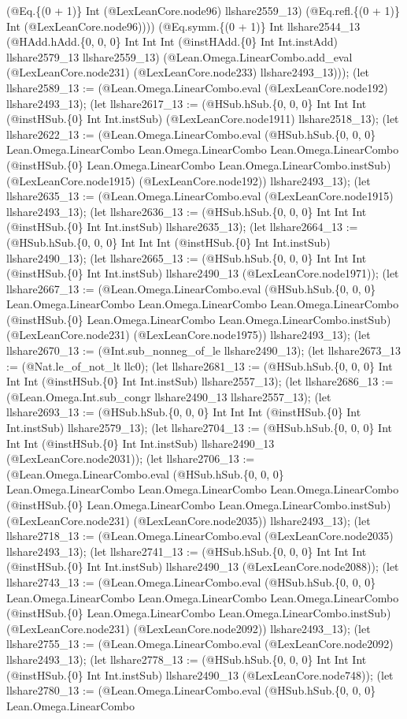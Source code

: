 \documentclass[11pt]{article}
\begin{document}
(@Eq.\{(0 + 1)\} Int (@LexLeanCore.node96) llshare2559\_13) (@Eq.refl.\{(0 + 1)\} Int (@LexLeanCore.node96)))) (@Eq.symm.\{(0 + 1)\} Int llshare2544\_13 (@HAdd.hAdd.\{0, 0, 0\} Int Int Int (@instHAdd.\{0\} Int Int.instAdd) llshare2579\_13 llshare2559\_13) (@Lean.Omega.LinearCombo.add\_eval (@LexLeanCore.node231) (@LexLeanCore.node233) llshare2493\_13))); (let llshare2589\_13 := (@Lean.Omega.LinearCombo.eval (@LexLeanCore.node192) llshare2493\_13); (let llshare2617\_13 := (@HSub.hSub.\{0, 0, 0\} Int Int Int (@instHSub.\{0\} Int Int.instSub) (@LexLeanCore.node1911) llshare2518\_13); (let llshare2622\_13 := (@Lean.Omega.LinearCombo.eval (@HSub.hSub.\{0, 0, 0\} Lean.Omega.LinearCombo Lean.Omega.LinearCombo Lean.Omega.LinearCombo (@instHSub.\{0\} Lean.Omega.LinearCombo Lean.Omega.LinearCombo.instSub) (@LexLeanCore.node1915) (@LexLeanCore.node192)) llshare2493\_13); (let llshare2635\_13 := (@Lean.Omega.LinearCombo.eval (@LexLeanCore.node1915) llshare2493\_13); (let llshare2636\_13 := (@HSub.hSub.\{0, 0, 0\} Int Int Int (@instHSub.\{0\} Int Int.instSub) llshare2635\_13); (let llshare2664\_13 := (@HSub.hSub.\{0, 0, 0\} Int Int Int (@instHSub.\{0\} Int Int.instSub) llshare2490\_13); (let llshare2665\_13 := (@HSub.hSub.\{0, 0, 0\} Int Int Int (@instHSub.\{0\} Int Int.instSub) llshare2490\_13 (@LexLeanCore.node1971)); (let llshare2667\_13 := (@Lean.Omega.LinearCombo.eval (@HSub.hSub.\{0, 0, 0\} Lean.Omega.LinearCombo Lean.Omega.LinearCombo Lean.Omega.LinearCombo (@instHSub.\{0\} Lean.Omega.LinearCombo Lean.Omega.LinearCombo.instSub) (@LexLeanCore.node231) (@LexLeanCore.node1975)) llshare2493\_13); (let llshare2670\_13 := (@Int.sub\_nonneg\_of\_le llshare2490\_13); (let llshare2673\_13 := (@Nat.le\_of\_not\_lt llc0); (let llshare2681\_13 := (@HSub.hSub.\{0, 0, 0\} Int Int Int (@instHSub.\{0\} Int Int.instSub) llshare2557\_13); (let llshare2686\_13 := (@Lean.Omega.Int.sub\_congr llshare2490\_13 llshare2557\_13); (let llshare2693\_13 := (@HSub.hSub.\{0, 0, 0\} Int Int Int (@instHSub.\{0\} Int Int.instSub) llshare2579\_13); (let llshare2704\_13 := (@HSub.hSub.\{0, 0, 0\} Int Int Int (@instHSub.\{0\} Int Int.instSub) llshare2490\_13 (@LexLeanCore.node2031)); (let llshare2706\_13 := (@Lean.Omega.LinearCombo.eval (@HSub.hSub.\{0, 0, 0\} Lean.Omega.LinearCombo Lean.Omega.LinearCombo Lean.Omega.LinearCombo (@instHSub.\{0\} Lean.Omega.LinearCombo Lean.Omega.LinearCombo.instSub) (@LexLeanCore.node231) (@LexLeanCore.node2035)) llshare2493\_13); (let llshare2718\_13 := (@Lean.Omega.LinearCombo.eval (@LexLeanCore.node2035) llshare2493\_13); (let llshare2741\_13 := (@HSub.hSub.\{0, 0, 0\} Int Int Int (@instHSub.\{0\} Int Int.instSub) llshare2490\_13 (@LexLeanCore.node2088)); (let llshare2743\_13 := (@Lean.Omega.LinearCombo.eval (@HSub.hSub.\{0, 0, 0\} Lean.Omega.LinearCombo Lean.Omega.LinearCombo Lean.Omega.LinearCombo (@instHSub.\{0\} Lean.Omega.LinearCombo Lean.Omega.LinearCombo.instSub) (@LexLeanCore.node231) (@LexLeanCore.node2092)) llshare2493\_13); (let llshare2755\_13 := (@Lean.Omega.LinearCombo.eval (@LexLeanCore.node2092) llshare2493\_13); (let llshare2778\_13 := (@HSub.hSub.\{0, 0, 0\} Int Int Int (@instHSub.\{0\} Int Int.instSub) llshare2490\_13 (@LexLeanCore.node748)); (let llshare2780\_13 := (@Lean.Omega.LinearCombo.eval (@HSub.hSub.\{0, 0, 0\} Lean.Omega.LinearCombo 
\end{document}
